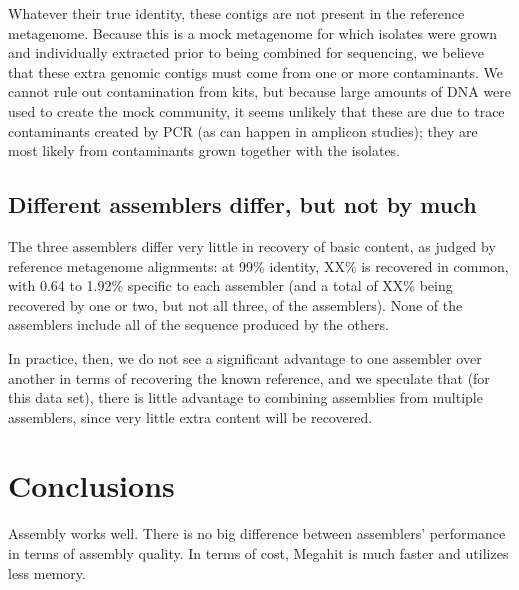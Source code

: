 \documentclass[10pt,a4paper,twocolumn]{article}
\begin{document}

Whatever their true identity, these contigs are not present in the
reference metagenome. Because this is a mock metagenome for which
isolates were grown and individually extracted prior to being combined
for sequencing, we believe that these extra genomic contigs must come
from one or more contaminants.  We cannot rule out contamination from
kits, but because large amounts of DNA were used to create the mock
community, it seems unlikely that these are due to trace contaminants
created by PCR (as can happen in amplicon studies); they are most
likely from contaminants grown together with the isolates.

\subsection*{Different assemblers differ, but not by much}

The three assemblers differ very little in recovery of basic content,
as judged by reference metagenome alignments: at 99\% identity, XX\%
is recovered in common, with 0.64 to 1.92\% specific to each assembler
(and a total of XX\% being recovered by one or two, but not all three,
of the assemblers). None of the assemblers include all of the sequence
produced by the others. %

In practice, then, we do not see a significant advantage to one
assembler over another in terms of recovering the known reference, and
we speculate that (for this data set), there is little advantage to
combining assemblies from multiple assemblers, since very little extra
content will be recovered.


\section*{Conclusions}

Assembly works well. There is no big difference between assemblers'
performance in terms of assembly quality. In terms of cost, Megahit is
much faster and utilizes less memory.
\end{document}

